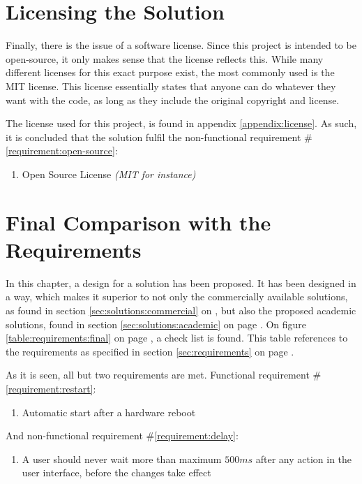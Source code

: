 	\section{Licensing the Solution}
		\label{requirement:fulfilled:open-source}
		Finally, there is the issue of a software license. Since this project is intended to be open-source, it only makes sense that the license reflects this. While many different licenses for this exact purpose exist, the most commonly used is the MIT license. This license essentially states that anyone can do whatever they want with the code, as long as they include the original copyright and license.

		The license used for this project, is found in appendix \ref{appendix:license}. As such, it is concluded that the solution fulfil the non-functional requirement \#\ref{requirement:open-source}:
		\vspace{-3ex}\begin{enumerate}
			\setlength\itemsep{0.1em}
			\setcounter{enumi}{2-1}
			\item Open Source License \emph{(MIT for instance)}
		\end{enumerate}


	\section{Final Comparison with the Requirements}
		In this chapter, a design for a solution has been proposed. It has been designed in a way, which makes it superior to not only the commercially available solutions, as found in section \ref{sec:solutions:commercial} on \pageref{sec:solutions:commercial}, but also the proposed academic solutions, found in section \ref{sec:solutions:academic} on page \pageref{sec:solutions:academic}. On figure \ref{table:requirements:final} on page \pageref{table:requirements:final}, a check list is found. This table references to the requirements as specified in section \ref{sec:requirements} on page \pageref{sec:requirements}.

		As it is seen, all but two requirements are met. Functional requirement \#\ref{requirement:restart}:
		\vspace{-3ex}\begin{enumerate}
			\setlength\itemsep{0.1em}
			\setcounter{enumi}{17-1}
			\item Automatic start after a hardware reboot
		\end{enumerate}
		And non-functional requirement \#\ref{requirement:delay}:
		\vspace{-3ex}\begin{enumerate}
			\setlength\itemsep{0.1em}
			\setcounter{enumi}{7-1}
			\item A user should never wait more than maximum $500ms$ after any action in the user interface, before the changes take effect 
		\end{enumerate}


